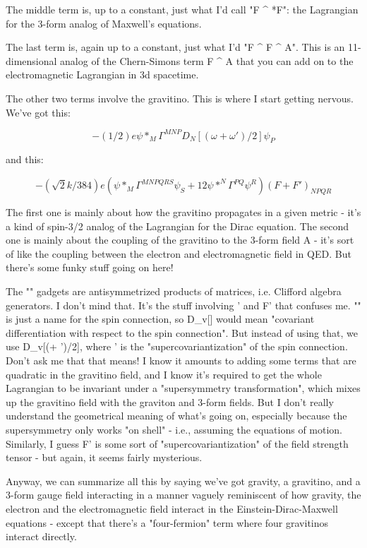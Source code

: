 The middle term is, up to a constant, just what I'd call "F ^
*F": the Lagrangian for the 3-form analog of Maxwell's equations.
 
The last term is, again up to a constant, just what I'd "F ^ F ^
A".  This is an 11-dimensional analog of the Chern-Simons term F ^
A that you can add on to the electromagnetic Lagrangian in 3d spacetime.
 
The other two terms involve the gravitino.  This is where I start getting 
nervous.  We've got this: 
 
$$
    - (1/2) e \psi *_{M} \Gamma ^{MNP} D_{N}[(\omega  + \omega ')/2] \psi _{P}
 
$$
    
and this: 
 
$$
     - (\sqrt 2k/384) e (\psi *_{M} \Gamma ^{MNPQRS} \psi _{S} + 12 \psi *^{N} \Gamma ^{PQ} \psi ^{R}) (F + F')_{NPQR} 
$$
    
The first one is mainly about how the gravitino propagates in a given 
metric - it's a kind of spin-3/2 analog of the Lagrangian for the Dirac 
equation.  The second one is mainly about the coupling of the gravitino 
to the 3-form field A - it's sort of like the coupling between the electron 
and electromagnetic field in QED.  But there's some funky stuff going on 
here!   
 
The "\Gamma " gadgets are antisymmetrized products of \gamma 
matrices, i.e. Clifford algebra generators.  I don't mind that.  It's
the stuff involving \omega ' and F' that confuses me.  "\omega "
is just a name for the spin connection, so D_{v}[\omega ] would mean
"covariant differentiation with respect to the spin
connection".  But instead of using that, we use D_{v}[(\omega  +
\omega ')/2], where \omega ' is the "supercovariantization" of the
spin connection.  Don't ask me that that means!  I know it amounts to
adding some terms that are quadratic in the gravitino field, and I know
it's required to get the whole Lagrangian to be invariant under a
"supersymmetry transformation", which mixes up the gravitino
field with the graviton and 3-form fields.  But I don't really
understand the geometrical meaning of what's going on, especially
because the supersymmetry only works "on shell" - i.e.,
assuming the equations of motion.  Similarly, I guess F' is some sort of
"supercovariantization" of the field strength tensor - but
again, it seems fairly mysterious.
 
Anyway, we can summarize all this by saying we've got gravity, a
gravitino, and a 3-form gauge field interacting in a manner vaguely
reminiscent of how gravity, the electron and the electromagnetic field
interact in the Einstein-Dirac-Maxwell equations - except that there's a
"four-fermion" term where four gravitinos interact directly.

